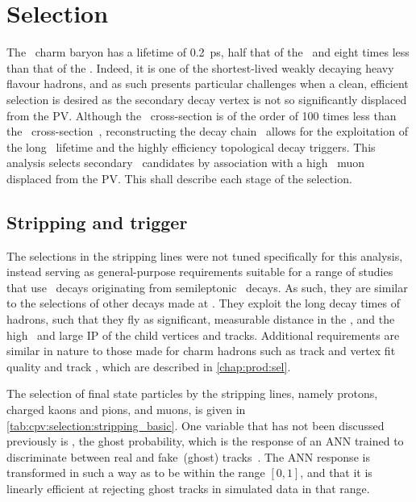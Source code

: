 \chapter{Selection}
\label{chap:cpv:selection}

The \PLambdac\ charm baryon has a lifetime of \SI{0.2}{\pico\second}, half that 
of the \PDzero\ and eight times less than that of the \PBzero.
Indeed, it is one of the shortest-lived weakly decaying heavy flavour hadrons, 
and as such presents particular challenges when a clean, efficient selection is 
desired as the secondary decay vertex is not so significantly displaced from 
the \ac{PV}.
Although the \bbbar\ cross-section is of the order of 100 times less than the 
\ccbar\ cross-section~\cite{LHCb-PAPER-2012-041,LHCb-PAPER-2013-004}, 
reconstructing the decay chain \LbToLcmuX\ allows for the exploitation of the 
long \PLambdab\ lifetime and the highly efficiency topological \PB decay 
triggers.
This analysis selects secondary \PLambdac\ candidates by association with a 
high \pT\ muon displaced from the \ac{PV}.
This  shall describe each stage of the selection.

\section{Stripping and trigger}
\label{chap:cpv:selection:stripping_trigger}

The selections in the stripping lines were not tuned specifically for this 
analysis, instead serving as general-purpose requirements suitable for a range 
of studies that use \LcTophh\ decays originating from semileptonic \PLambdab\ 
decays.
As such, they are similar to the selections of other \PB decays made at \lhcb.
They exploit the long decay times of \PB hadrons, such that they fly as 
significant, measurable distance in the \velo, and the high \pT\ and large 
\acl{IP} of the child vertices and tracks.
Additional requirements are similar in nature to those made for charm hadrons 
such as track and vertex fit quality and track \ipchisq, which are described in 
\cref{chap:prod:sel}.

The selection of final state particles by the stripping lines, namely protons, 
charged kaons and pions, and muons, is given in 
\cref{tab:cpv:selection:stripping_basic}.
One variable that has not been discussed previously is \pghost, the ghost 
probability, which is the response of an \ac{ANN} trained to discriminate 
between real and fake~(ghost) tracks~\cite{Brehmer:1478372}.
The \ac{ANN} response is transformed in such a way as to be within the range 
$[0, 1]$, and that it is linearly efficient at rejecting ghost tracks in 
simulated data in that range.

